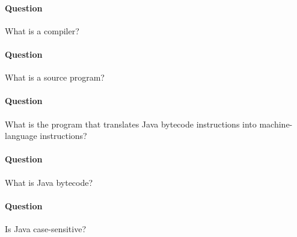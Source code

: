 \documentclass{article}
\begin{document}
\addtocounter{question_num}{1}
\paragraph{Question }
What is a compiler?

\addtocounter{question_num}{1}
\paragraph{Question }
What is a source program?

\addtocounter{question_num}{1}
\paragraph{Question }
What is the program that translates Java bytecode instructions into machine-language instructions?

\addtocounter{question_num}{1}
\paragraph{Question }
What is Java bytecode?

\addtocounter{question_num}{1}
\paragraph{Question }
Is Java case-sensitive?
\end{document}
